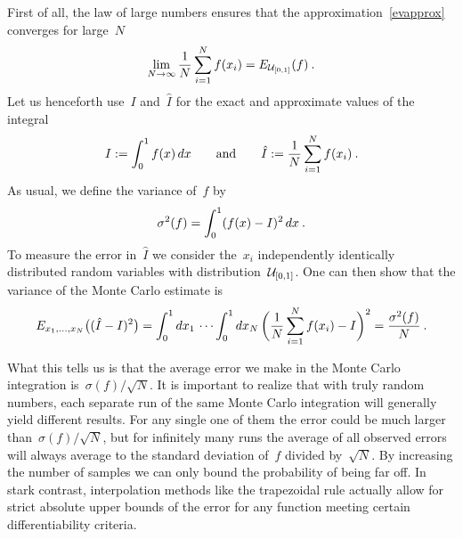 First of all, the law of large numbers ensures that the
approximation~\eqref{evapprox} converges for large~$N$
%
\begin{equation}
  \lim_{N \to \infty} \frac{1}{N} \sum_{i = 1}^N f(x_i) = E_{\mathcal{U}_{[0,1]}}(f)\:.
\end{equation}
%
Let us henceforth use~$I$ and~$\hat{I}$ for the exact and approximate values of
the integral
%
\begin{equation}
  I := \int_0^1 f(x) \,dx \qquad\text{and}\qquad
  \hat{I} := \frac{1}{N} \sum_{i=1}^N f(x_i)\:.
\end{equation}
%
As usual, we define the variance of~$f$ by
%
\begin{equation}
  \sigma^2(f) = \int_0^1 (f(x) - I)^2 \,dx\:.
\end{equation}
%
To measure the error in~$\hat{I}$ we consider the~$x_i$ independently
identically distributed random variables with distribution~$\mathcal{U}_{[0,1]}$. One
can then show that the variance of the Monte Carlo estimate is
%
\begin{equation}\label{mcerror}
  E_{x_1, \dots , x_N}\bigl((\hat{I} - I)^2\bigr) =
  \int_0^1 dx_1\, \cdots \int_0^1 dx_N\,
  \biggl(\frac{1}{N} \sum_{i=1}^N f(x_i) - I\biggr)^2 =
  \frac{\sigma^2(f)}{N}\:.
\end{equation}

What this tells us is that the average error we make in the Monte Carlo
integration is~$\sigma(f)/\sqrt{N}$. It is important to realize that with truly
random numbers, each separate run of the same Monte Carlo integration will
generally yield different results. For any single one of them the error could be
much larger than~$\sigma(f)/\sqrt{N}$, but for infinitely many runs the average
of all observed errors will always average to the standard deviation of~$f$
divided by~$\sqrt{N}$. By increasing the number of samples we can only bound the
probability of being far off. In stark contrast, interpolation methods like the
trapezoidal rule actually allow for strict absolute upper bounds of the error
for any function meeting certain differentiability criteria.

